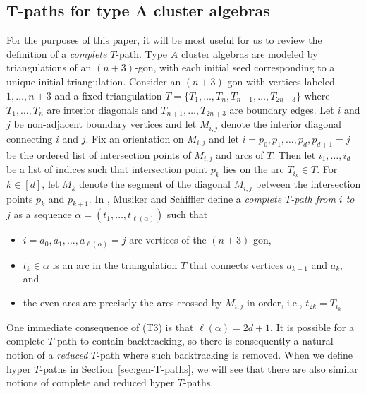 \documentclass[pdftex]{sigma}
\numberwithin{equation}{section}
\newcommand{\new}[1]{{#1}}
\begin{document}
\subsection[T-paths for type A cluster algebras]{$\boldsymbol{T}$-paths for type $\boldsymbol{A}$ cluster algebras}\label{sec:T-path-bg}
For the purposes of this paper, it will be most useful for us to review the definition of a \emph{complete} $T$-path.
Type $A$ cluster algebras are modeled by triangulations of an $(n+3)$-gon, with each initial seed corresponding to a unique initial triangulation. Consider an $(n+3)$-gon with vertices labeled $1, \dots, n+3$ and a fixed triangulation $T = \{ T_1, \dots, T_n, T_{n+1}, \dots, T_{2n+3} \}$ where $T_1, \dots, T_n$ are interior diagonals and $T_{n+1},\dots, T_{2n+3}$ are boundary edges. Let $i$ and $j$ be non-adjacent boundary vertices and let $M_{i,j}$ denote the interior diagonal connecting $i$ and $j$. Fix an orientation on $M_{i,j}$ and let $i = p_0, p_1, \dots, p_{d}, p_{d+1} = j$ be the ordered list of intersection points of $M_{i,j}$ and arcs of $T$. Then let $i_1, \dots, i_{d}$ be a list of indices such that intersection point $p_k$ lies on the arc $T_{i_k} \in T$.
For $k \in [d]$, let $M_k$ denote the segment of the diagonal $M_{i,j}$ between the intersection points $p_k$ and $p_{k+1}$.
In \cite{MS-09}, Musiker and Schiffler define a \emph{complete $T$-path from $i$ to $j$} as a sequence $\alpha = ( t_1,\dots,t_{\ell(\alpha)})$ such that
\begin{itemize}\itemsep=0pt
 \item[(T1)] $i = a_0,a_1, \dots,a_{\ell(\alpha)} = j$ are vertices of the $(n+3)$-gon,
 \item[(T2)] $t_k \in \alpha$ is an arc in the triangulation $T$ that connects vertices $a_{k-1}$ and $a_k$, and
 \item[(T3)] the even arcs are precisely the arcs crossed by $M_{i,j}$ in order, i.e., $t_{2k} = T_{i_k}$.
\end{itemize}
One immediate consequence of (T3) is that
\new{$\ell(\alpha)=2d+1$}.
It is possible for a complete $T$-path to contain backtracking, so there is consequently a natural notion of a \emph{reduced} $T$-path where such backtracking is removed. When we define hyper $T$-paths in Section~\ref{sec:gen-T-paths}, we will see that there are also similar notions of complete and reduced hyper $T$-paths.
\end{document}
